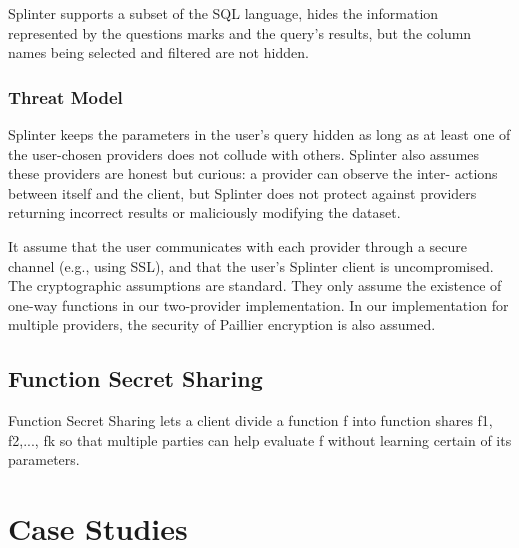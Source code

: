 \documentclass[12pt,a4paper]{article}
\begin{document}
\begin{multicols}{2}
Splinter supports a subset of the SQL language, 
hides the information represented by the questions 
marks and the query’s results, but the column names 
being selected and filtered are not hidden.
\subsubsection{Threat Model}
Splinter keeps the parameters in the user’s query 
hidden as long as at least one of the user-chosen 
providers does not collude with others. Splinter 
also assumes these providers are honest but 
curious: a provider can observe the inter- actions 
between itself and the client, but Splinter does 
not protect against providers returning incorrect 
results or maliciously modifying the dataset.

It assume that the user communicates with each 
provider through a secure channel (e.g., using 
SSL), and that the user’s Splinter client is 
uncompromised. The cryptographic assumptions are 
standard. They only assume the existence of one-way 
functions in our two-provider implementation. In 
our implementation for multiple providers, the 
security of Paillier encryption is also 
assumed.
\subsection{Function Secret Sharing}
Function Secret Sharing lets a client divide a function f into function shares f1, f2,..., fk so that multiple parties can help evaluate f without learning certain of its parameters.
\section{Case Studies}

\end{multicols}
\end{document}
